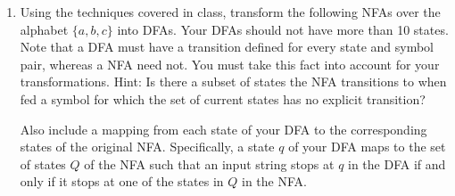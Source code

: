 \documentclass[11pt]{article}
\begin{document}
\begin{enumerate}

\newpage

\item Using the techniques covered in class, transform the following NFAs over the alphabet $\{a, b, c\}$ into DFAs. Your DFAs should not have more than 10 states.  Note that a DFA must have a transition defined for every state and symbol pair, whereas a NFA need not. You must take this fact into account for your transformations. Hint: Is there a subset of states the NFA transitions to when fed a symbol for which the set of current states has no explicit transition?

Also include a mapping from each state of your DFA to the corresponding states of the original NFA.  Specifically, a state $q$ of your DFA maps to the set of states $Q$ of the NFA such that an input string stops at $q$ in the DFA if and only if it stops at one of the states in $Q$ in the NFA.


\end{enumerate}
\end{document}
